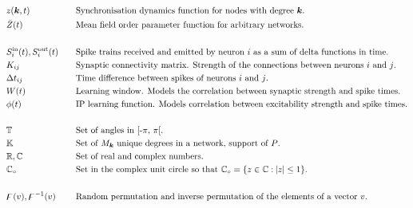 \begin{alignat*}{2}
& z({\boldsymbol{k}}, t) &&\text{Synchronisation dynamics function for nodes with degree ${\boldsymbol{k}}$.}\\
& \bar{Z}(t) &&\text{Mean field order parameter function for arbitrary networks.}\\ \\
& S_i^{\rm in}(t), S_i^{\rm out}(t)\quad &&\text{Spike trains received and emitted by neuron $i$ as a sum of delta functions in time.}\\ 
& K_{ij} &&\text{Synaptic connectivity matrix. Strength of the connections between neurons $i$ and $j$.}\\
& \Delta t_{ij} &&\text{Time difference between spikes of neurons $i$ and $j$.}\\
& W(t) &&\text{Learning window. Models the correlation between synaptic strength and spike times.}\\ 
& \phi(t) &&\text{IP learning function. Models correlation between excitability strength and spike times.}\\ \\
& {\mathbb{T}} &&\text{Set of angles in [-$\pi$, $\pi$[.}\\
& {\mathbb{K}} &&\text{Set of $M_{{\boldsymbol{k}}}$ unique degrees in a network, support of $P$.}\\ 
& {\mathbb{R}}, {\mathbb{C}} &&\text{Set of real and complex numbers.}\\ 
&  \mathbb{C}_\circ && \text{Set in the complex unit circle so that $\mathbb{C}_\circ = \{ z \in {\mathbb{C}} : \: \rvert z \rvert \leq 1 \} $.} \\ \\
& {\digamma}(v), {\digamma^{-1}}(v) &&\text{Random permutation and inverse permutation of the elements of a vector $v$.}\\ 
\end{alignat*}
